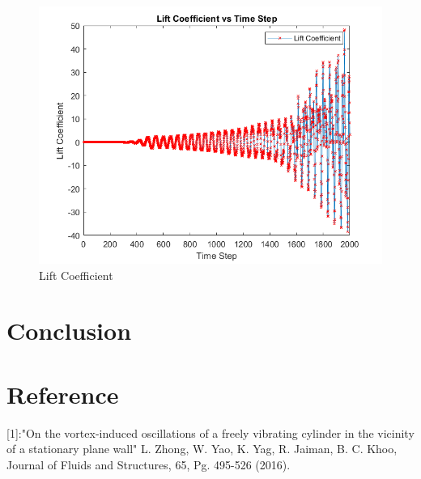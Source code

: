 \documentclass[a4paper,12pt]{article} %
\begin{document}
\begin{figure}[htbp]
    \center
    \includegraphics[scale=0.6]{Cl_1.png}
    \caption{Lift Coefficient}
\end{figure}


\section*{Conclusion}

\section*{Reference}
[1]:"On the vortex-induced oscillations of a freely vibrating cylinder in the vicinity of a stationary plane wall" L.
Zhong, W. Yao, K. Yag, R. Jaiman, B. C. Khoo, Journal of Fluids and Structures, 65, Pg. 495-526 (2016).
\end{document}
